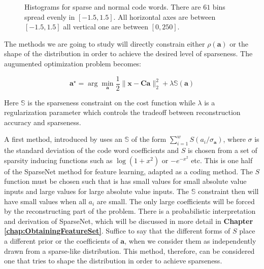 \documentclass[12pt,a4paper,oneside,english]{UPBThesis}
\begin{document}
\begin{figure}
\centering
{}
\caption{Histograms for sparse and normal code words. There are $61$ bins spread evenly in $[-1.5,1.5]$. All horizontal axes are between $[-1.5,1.5]$ all vertical one are between $[0,250]$.}
\label{fig:CodingMethodsCoeffHists}
\end{figure}

The methods we are going to study will directly constrain either $\rho(\textbf{a})$ or the shape of the distribution in order to achieve the desired level of sparseness. The augumented optimization problem becomes:

\begin{equation*}
\textbf{a}^{\star} = \arg\min_{\textbf{a}} \frac{1}{2} \| \textbf{x} - \textbf{C}\textbf{a} \|_2^2 + \lambda \mathbb{S}(\textbf{a})
\end{equation*}

Here $\mathbb{S}$ is the sparseness constraint on the cost function while $\lambda$ is a regularization parameter which controls the tradeoff between reconstruction accuracy and sparseness.

A first method, introduced by \cite{emergence-sparse-coding} uses an $\mathbb{S}$ of the form $\sum_{i=1}^w{S(a_i / \sigma_{\textbf{a}})}$, where $\sigma$ is the standard deviation of the code word coefficients and $S$ is chosen from a set of sparsity inducing functions such as $\log(1 + x^2)$ or $-e^{-x^2}$ etc. This is one half of the SparseNet method for feature learning, adapted as a coding method. The $S$ function must be chosen such that is has small values for small absolute value inputs and large values for large absolute value inputs. The $\mathbb{S}$ constraint then will have small values when all $a_i$ are small. The only large coefficients will be forced by the reconstructing part of the problem. There is a probabilistic interpretation and derivation of SparseNet, which will be discussed in more detail in \textbf{Chapter \ref{chap:ObtainingFeatureSet}}. Suffice to say that the different forms of $S$ place a different prior or the coefficients of $\textbf{a}$, when we consider them as independently drawn from a sparse-like distribution. This method, therefore, can be considered one that tries to shape the distribution in order to achieve sparseness.
\end{document}
